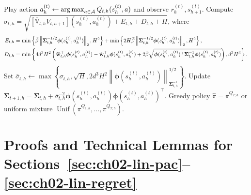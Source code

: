 \begin{algorithm}[htbp]
\begin{algorithmic}[1]
                \State Play action $a_h^{(t)} \leftarrow \argmax_{a \in \gA} Q_{t,h}(s_h^{(t)}, a)$ and observe $r_h^{(t)}, s_{h+1}^{(t)}$.
                \State Compute $\sigma_{t, h}=\sqrt{\left[\overline{\mathbb{V}}_{t, h} V_{t, h+1}\right]\!\left(s_h^{(t)}, a_h^{(t)}\right)+E_{t, h}+D_{t, h}+H}$, where
                \begin{align*}
                    E_{t, h} &= \min \left\{\widetilde{\beta}\left\|\boldsymbol{\Sigma}_{t, h}^{-1 / 2} \boldsymbol{\phi}(s_h^{(t)}, a_h^{(t)})\right\|_2, H^2\right\}+\min \left\{2 H \bar{\beta}\left\|\boldsymbol{\Sigma}_{t, h}^{-1 / 2} \boldsymbol{\phi}(s_h^{(t)}, a_h^{(t)})\right\|_2, H^2\right\}, \\
                    D_{t, h} &= \min \left\{4 d^3 H^2 \left(\widehat{\mathbf{w}}_{t, h}^{\top} \boldsymbol{\phi}(s_h^{(t)}, a_h^{(t)})-\widecheck{\mathbf{w}}_{t, h}^{\top} \boldsymbol{\phi}(s_h^{(t)}, a_h^{(t)}) + 2 \bar{\beta} \sqrt{\boldsymbol{\phi}(s_h^{(t)}, a_h^{(t)})^{\top} \boldsymbol{\Sigma}_{t, h}^{-1} \boldsymbol{\phi}(s_h^{(t)}, a_h^{(t)})}\right), d^3 H^3\right\}.
                \end{align*}
                \State Set ${\bar{\sigma}}_{t, h} \leftarrow \max \left\{\sigma_{t, h}, \sqrt{H}, 2 d^3 H^2\left\|\boldsymbol{\phi}\!\left(s_h^{(t)}, a_h^{(t)}\right)\right\|_{\boldsymbol{\Sigma}_{t, h}^{-1}}^{1 / 2}\right\}$.
                \State Update $\boldsymbol{\Sigma}_{t+1, h}=\boldsymbol{\Sigma}_{t, h}+\bar{\sigma}_{t, h}^{-2} \boldsymbol{\phi}\!\left(s_h^{(t)}, a_h^{(t)}\right) \boldsymbol{\phi}\!\left(s_h^{(t)},a_h^{(t)}\right)^{\top}$.
            \EndFor
        \EndFor
         Greedy policy $\widehat{\pi} = \pi^{Q_{T,h}}$ or uniform mixture $\operatorname{Unif}(\pi^{Q_{1,h}},\dots,\pi^{Q_{T,h}})$.
    \end{algorithmic}
\end{algorithm}

\section{Proofs and Technical Lemmas for Sections~\ref{sec:ch02-lin-pac}--\ref{sec:ch02-lin-regret}}
\label{app:ch02-hybridoffline}
\label{lem:ch02-cov-bound}
\label{app:ch02-proof-cor-rappel-tab}
\label{app:ch02-hybridonline}
\label{lem:ch02-hybridoffline-sumbonuses}
\label{lem:ch02-hybridoffline-concentrability}
\label{lem:ch02-hybridonline-sumbonuses-xon}
\label{app:ch02-misc}
\label{lem:ch02-optcov-correct}
\label{lem:ch02-total-variance-concentration}
\label{lem:ch02-hole-digging}
\label{lem:ch02-zhou2022-B1-modified}
\label{lem:ch02-4.1}

